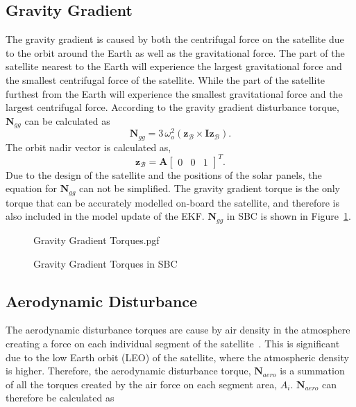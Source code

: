 \subsection{Gravity Gradient}
The gravity gradient is caused by both the centrifugal force on the satellite due to the orbit around the Earth as well as the gravitational force. The part of the satellite nearest to the Earth will experience the largest gravitational force and the smallest centrifugal force of the satellite. While the part of the satellite furthest from the Earth will experience the smallest gravitational force and the largest centrifugal force. According to \cite{wertz2012spacecraft} the gravity gradient disturbance torque, $\mathbf{N}_{gg}$ can be calculated as 
\begin{equation}
\boldsymbol{N}_{gg} = 3 \, \omega_o^2 (\mathbf{z}_{\mathcal{B}} \times \mathbf{Iz}_{\mathcal{B}}).
\end{equation}
The orbit nadir vector is calculated as,
\begin{equation}
\mathbf{z}_{\mathcal{B}} = \boldsymbol{A} \begin{bmatrix} 0 & 0 & 1 \end{bmatrix}^T.
\end{equation}
Due to the design of the satellite and the positions of the solar panels, the equation for $\mathbf{N}_{gg}$ can not be simplified. The gravity gradient torque is the only torque that can be accurately modelled on-board the satellite, and therefore is also included in the model update of the EKF. $\mathbf{N}_{gg}$ in SBC is shown in Figure~\ref{fig:GravityGradientTorques}.

\begin{figure}[!htb]
	\centering
	\def\pgfwidth{10cm}
	{Gravity Gradient Torques.pgf}
	
	\caption{Gravity Gradient Torques in SBC}
	\label{fig:GravityGradientTorques}
\end{figure}

\subsection{Aerodynamic Disturbance}
The aerodynamic disturbance torques are cause by air density in the atmosphere creating a force on each individual segment of the satellite~\cite{Steyn2014}. This is significant due to the low Earth orbit (LEO) of the satellite, where the atmospheric density is higher. Therefore, the aerodynamic disturbance torque, $\mathbf{N}_{aero}$ is a summation of all the torques created by the air force on each segment area, $A_i$. $\mathbf{N}_{aero}$ can therefore be calculated as

